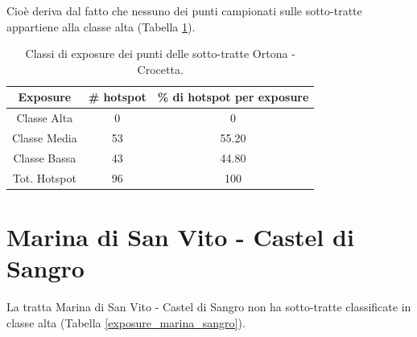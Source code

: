 Cioè deriva dal fatto che nessuno dei punti campionati sulle sotto-tratte appartiene alla classe alta (Tabella \ref{risultati_ortona_crocetta}).

\begin{table}[H]
	\centering
	\begin{tabular}{|c|c|c|}
		\hline
		\rowcolor[HTML]{C0C0C0} 
		\textbf{Exposure} & \textbf{\# hotspot} & \textbf{\% di hotspot per exposure} \\ \hline
		Classe Alta       & 0                  & 0                                   \\ \hline
		Classe Media      & 53                  & 55.20                           \\ \hline
		Classe Bassa      & 43                & 44.80                               \\ \hline
		Tot. Hotspot      & 96               & 100                                 \\ \hline
	\end{tabular}
	\caption{Classi di exposure dei punti delle sotto-tratte Ortona - Crocetta. }
	\label{risultati_ortona_crocetta}
\end{table}


\section{Marina di San Vito - Castel di Sangro}
La tratta Marina di San Vito - Castel di Sangro non ha sotto-tratte classificate in classe alta (Tabella \ref{exposure_marina_sangro}). 

